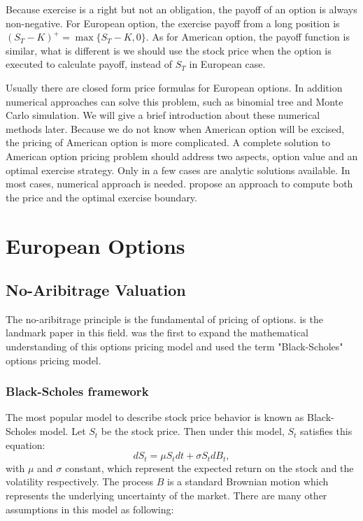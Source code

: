 \documentclass[11pt]{book}
\begin{document}
Because exercise is a right but not an obligation, the payoff of an option is always non-negative. For European option, the exercise payoff from a long position is $(S_T - K)^+ = \max \{S_T-K,0\}$. As for American option, the payoff function is similar, what is different is we should use the stock price when the option is executed to calculate payoff, instead of $S_T$ in European case.



Usually there are closed form price formulas for European options. In addition numerical approaches can solve this problem, such as binomial tree and Monte Carlo simulation. We will give a brief introduction about these numerical methods later. Because we do not know when American option will be excised, the pricing of American option is more complicated. A complete solution to American option pricing problem should address two aspects, option value and an optimal exercise strategy. Only in a few cases are analytic solutions available. In most cases, numerical approach is needed. \cite{Lim2004} propose an approach to compute both the price and the optimal exercise boundary.


\section{European Options}
\subsection{No-Aribitrage Valuation}

The no-aribitrage principle is the fundamental of pricing of options. \citet*{Black:1973} is the landmark paper in this field. \citet*{merton1973} was the first to expand the mathematical understanding of this options pricing model and used the term "Black-Scholes" options pricing model.

\subsubsection{Black-Scholes framework}
The most popular model to describe stock price behavior is known as Black-Scholes model.
Let $S_t$ be the stock price. Then under this model, $S_t$ satisfies this equation:
\begin{equation}\label{eq:1}
dS_t = \mu S_tdt + \sigma S_tdB_t,
\end{equation}
with $\mu$ and $\sigma $ constant,  which represent the expected return on the stock and the volatility respectively. The process $B$ is a standard Brownian motion which represents the underlying uncertainty of the market. There are many other assumptions in this model as following:
\end{document}
